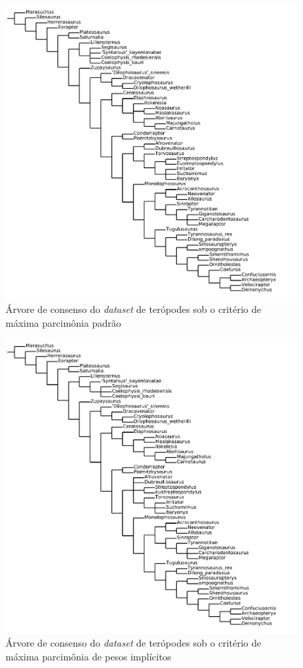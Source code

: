 \documentclass[12pt]{article}
\begin{document}
\begin{figure}[ht]
  \centering
  \includegraphics[width=\textwidth]{img/theropods-smp_svg-tex.pdf}
  \caption{Árvore de consenso do \emph{dataset} de terópodes sob o critério de máxima parcimônia padrão}
  \label{fig:theropods-smp}
\end{figure}
\begin{figure}[ht]
  \includegraphics[width=\textwidth]{img/theropods-iwmp_svg-tex.pdf}
  \caption{Árvore de consenso do \emph{dataset} de terópodes sob o critério de máxima parcimônia de pesos implícitos}
  \label{fig:theropods-iwmp}
\end{figure}
\end{document}
